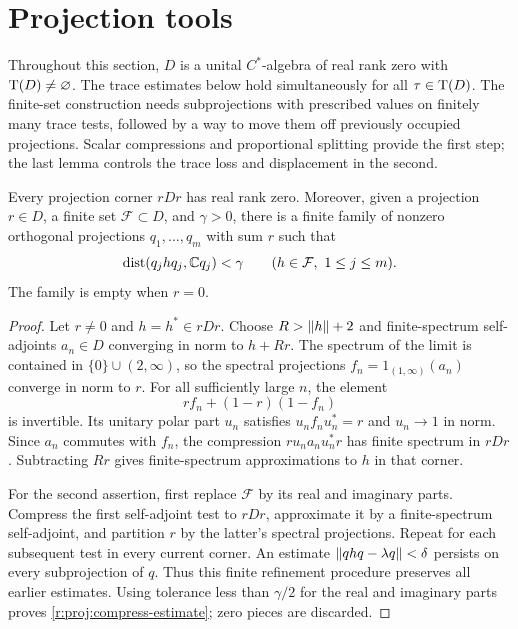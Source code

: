 \section{Projection tools}\label{r:sec:projections}

Throughout this section, $D$ is a unital $C^*$-algebra of real rank zero
with $\operatorname T(D)\ne\varnothing$.  The trace estimates below hold simultaneously
for all $\tau\in\operatorname T(D)$.  The finite-set construction needs subprojections
with prescribed values on finitely many trace tests, followed by a way to
move them off previously occupied projections.  Scalar compressions and
proportional splitting provide the first step; the last lemma controls
the trace loss and displacement in the second.

\begin{lemma}\label{r:proj:compress}
Every projection corner $rDr$ has real rank zero.  Moreover, given a
projection $r\in D$, a finite set $\mathcal F\subset D$, and $\gamma>0$,
there is a finite family of nonzero orthogonal projections $q_1,\ldots,q_m$
with sum $r$ such that
\begin{equation}\label{r:proj:compress-estimate}
  \operatorname{dist}(q_j hq_j,\mathbb C q_j)<\gamma
  \qquad(h\in\mathcal F,\ 1\le j\le m).
\end{equation}
The family is empty when $r=0$.
\end{lemma}

\begin{proof}
Let $r\ne0$ and $h=h^*\in rDr$.  Choose $R>\lVert h\rVert+2$ and finite-spectrum
self-adjoints $a_n\in D$ converging in norm to $h+Rr$.  The spectrum of the
limit is contained in $\{0\}\cup(2,\infty)$, so the spectral projections
$f_n=1_{(1,\infty)}(a_n)$ converge in norm to $r$.  For all sufficiently
large $n$, the element
\[
  r f_n+(1-r)(1-f_n)
\]
is invertible.  Its unitary polar part $u_n$ satisfies
$u_n f_n u_n^*=r$ and $u_n\to1$ in norm.  Since $a_n$ commutes with $f_n$,
the compression $r u_n a_n u_n^*r$ has finite spectrum in $rDr$.
Subtracting $Rr$ gives finite-spectrum approximations to $h$ in that
corner.

For the second assertion, first replace $\mathcal F$ by its real and
imaginary parts.  Compress the first self-adjoint test to $rDr$, approximate
it by a finite-spectrum self-adjoint, and partition $r$ by the latter's
spectral projections.  Repeat for each subsequent test in every current
corner.  An estimate
$\lVert q hq-\lambda q\rVert<\delta$ persists on every subprojection of $q$.
Thus this finite refinement procedure preserves all earlier estimates.
Using tolerance less than $\gamma/2$ for the real and imaginary parts
proves \eqref{r:proj:compress-estimate}; zero pieces are discarded.
\end{proof}

